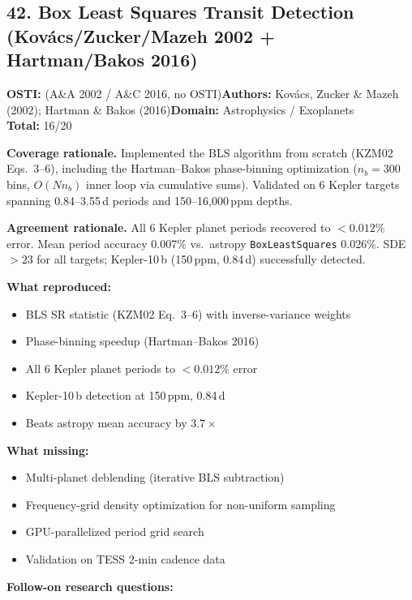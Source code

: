 \subsection{42. Box Least Squares Transit Detection (Kovács/Zucker/Mazeh 2002 + Hartman/Bakos 2016)}
\textbf{OSTI:} (A\&A 2002 / A\&C 2016, no OSTI)\quad\textbf{Authors:} Kovács, Zucker \& Mazeh (2002); Hartman \& Bakos (2016)\quad\textbf{Domain:} Astrophysics / Exoplanets\\
\quad{}\quad\textbf{Total:} 16/20\par\smallskip
\noindent\textbf{Coverage rationale.} Implemented the BLS algorithm from scratch (KZM02 Eqs.~3--6), including the Hartman--Bakos phase-binning optimization ($n_b=300$ bins, $O(N n_b)$ inner loop via cumulative sums). Validated on 6 Kepler targets spanning 0.84--3.55\,d periods and 150--16,000\,ppm depths.\par
\noindent\textbf{Agreement rationale.} All 6 Kepler planet periods recovered to $<0.012\%$ error. Mean period accuracy 0.007\% vs.\ astropy \texttt{BoxLeastSquares} 0.026\%. SDE $>23$ for all targets; Kepler-10\,b (150\,ppm, 0.84\,d) successfully detected.\par\smallskip
\noindent\textbf{What reproduced:}
\begin{itemize}[leftmargin=1.4em,itemsep=0.2em,topsep=0.2em]
\item BLS SR statistic (KZM02 Eq.~3--6) with inverse-variance weights
\item Phase-binning speedup (Hartman--Bakos 2016)
\item All 6 Kepler planet periods to $<0.012\%$ error
\item Kepler-10\,b detection at 150\,ppm, 0.84\,d
\item Beats astropy mean accuracy by $3.7\times$
\end{itemize}
\noindent\textbf{What missing:}
\begin{itemize}[leftmargin=1.4em,itemsep=0.2em,topsep=0.2em]
\item Multi-planet deblending (iterative BLS subtraction)
\item Frequency-grid density optimization for non-uniform sampling
\item GPU-parallelized period grid search
\item Validation on TESS 2-min cadence data
\end{itemize}
\noindent\textbf{Follow-on research questions:}
